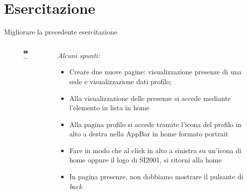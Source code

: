 \documentclass{../libs/presentation_format}
\begin{document}


\section{Esercitazione}
\begin{frame}{Migliorare la precedente esercitazione}
	\begin{minipage}[0.2\textheight]{\textwidth}
		\begin{columns}[T]
			\begin{column}{0.4\textwidth}
				\begin{figure}[htpb]
					\centering
					\includegraphics[width=2cm]{../libs/assignment-2-home}
				\end{figure}
			\end{column}
			\begin{column}{0.6\textwidth}
				\emph{Alcuni spunti:}
				\begin{itemize}
					\item Creare due nuove pagine: visualizzazione presenze di una sede e visualizzazione dati profilo;
					\item Alla visualizzazione delle presenze si accede mediante l'elemento in lista in home
					\item Alla pagina profilo si accede tramite l'icona del profilo in alto a destra nella AppBar in home formato portrait
					\item Fare in modo che al click in alto a sinistra su un'icona di home oppure il logo di SI2001, si ritorni alla home
					\item In pagina presenze, non dobbiamo mostrare il pulsante di \emph{back}
				\end{itemize}
			\end{column}
		\end{columns}
	\end{minipage}
\end{frame}


\end{document}
